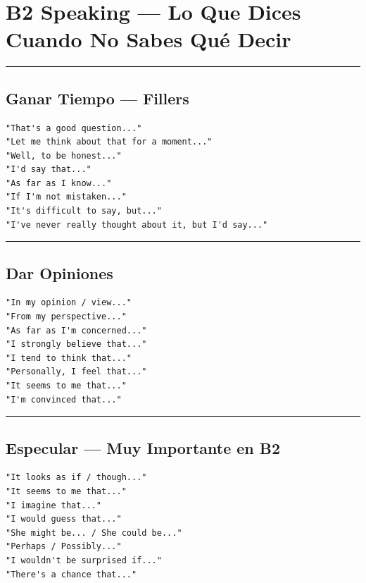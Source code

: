 \documentclass[
  spanish,
  letterpaper,
]{scrbook}
\begin{document}
\section{B2 Speaking --- Lo Que Dices Cuando No Sabes Qué
Decir}\label{b2-speaking-lo-que-dices-cuando-no-sabes-quuxe9-decir}

\begin{center}\rule{0.5\linewidth}{0.5pt}\end{center}

\subsection{Ganar Tiempo --- Fillers}\label{ganar-tiempo-fillers}

\begin{verbatim}
"That's a good question..."
"Let me think about that for a moment..."
"Well, to be honest..."
"I'd say that..."
"As far as I know..."
"If I'm not mistaken..."
"It's difficult to say, but..."
"I've never really thought about it, but I'd say..."
\end{verbatim}

\begin{center}\rule{0.5\linewidth}{0.5pt}\end{center}

\subsection{Dar Opiniones}\label{dar-opiniones}

\begin{verbatim}
"In my opinion / view..."
"From my perspective..."
"As far as I'm concerned..."
"I strongly believe that..."
"I tend to think that..."
"Personally, I feel that..."
"It seems to me that..."
"I'm convinced that..."
\end{verbatim}

\begin{center}\rule{0.5\linewidth}{0.5pt}\end{center}

\subsection{Especular --- Muy Importante en
B2}\label{especular-muy-importante-en-b2}

\begin{verbatim}
"It looks as if / though..."
"It seems to me that..."
"I imagine that..."
"I would guess that..."
"She might be... / She could be..."
"Perhaps / Possibly..."
"I wouldn't be surprised if..."
"There's a chance that..."
\end{verbatim}
\end{document}
